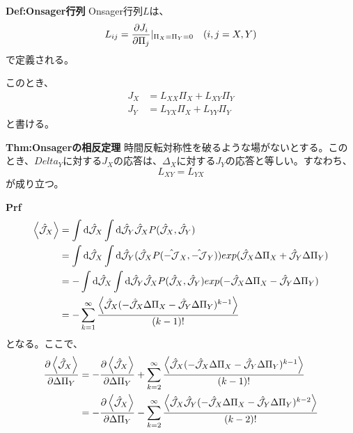 \documentclass[a4paper,11pt]{jsarticle}
\begin{document}
\begin{itembox}[l]{\textbf{Def:Onsager行列}}
    Onsager行列$L$は、
    \begin{equation}
        L_{ij} = \pdv{J_i}{\Pi_j}|_{\Pi_X=\Pi_Y=0} \quad (i,j = X,Y)
    \end{equation}
    で定義される。
\end{itembox}
このとき、
\begin{align}
    J_X &= L_{XX}\Pi_X + L_{XY}\Pi_Y\\
    J_Y &= L_{YX}\Pi_X + L_{YY}\Pi_Y
\end{align}
と書ける。\\
\begin{itembox}[l]{\textbf{Thm:Onsagerの相反定理}}
    時間反転対称性を破るような場がないとする。このとき、$Delta_Y$に対する$J_X$の応答は、$\Delta_X$に対する$J_Y$の応答と等しい。すなわち、
    \begin{equation}
        L_{XY} = L_{YX}
    \end{equation}
    が成り立つ。
\end{itembox}
\textbf{Prf}\\
\begin{align}
    \ev{\hat{\mathcal{J}}_X} &= \int \dd \hat{\mathcal{J}}_X \int \dd \hat{\mathcal{J}}_Y \hat{\mathcal{J}}_X P(\hat{\mathcal{J}}_X, \hat{\mathcal{J}}_Y)\\
    &= \int \dd \hat{\mathcal{J}}_X \int \dd \hat{\mathcal{J}}_Y (\hat{\mathcal{J}}_X P(\hat{-\mathcal{J}}_X, \hat{-\mathcal{J}}_Y))exp(\hat{\mathcal{J}}_X \Delta \Pi_X + \hat{\mathcal{J}}_Y \Delta \Pi_Y)\\
    &= -\int \dd \hat{\mathcal{J}}_X \int \dd \hat{\mathcal{J}}_Y \hat{\mathcal{J}}_X P(\hat{\mathcal{J}}_X, \hat{\mathcal{J}}_Y)exp(-\hat{\mathcal{J}}_X \Delta \Pi_X - \hat{\mathcal{J}}_Y \Delta \Pi_Y)\\
    &= -\sum_{k=1}^{\infty} \frac{\ev{\hat{\mathcal{J}}_X(-\hat{\mathcal{J}}_X\Delta \Pi_X-\hat{\mathcal{J}}_Y\Delta \Pi_Y)^{k-1}}}{(k-1)!}
\end{align}
となる。ここで、
\begin{align}
    \pdv{\ev{\hat{\mathcal{J}}_X}}{\Delta \Pi_Y} &= -\pdv{\ev{\hat{\mathcal{J}}_X}}{\Delta \Pi_Y} + \sum_{k=2}^{\infty} \frac{\ev{\hat{\mathcal{J}}_X(-\hat{\mathcal{J}}_X\Delta \Pi_X-\hat{\mathcal{J}}_Y\Delta \Pi_Y)^{k-1}}}{(k-1)!}\\
    &= -\pdv{\ev{\hat{\mathcal{J}}_X}}{\Delta \Pi_Y} - \sum_{k=2}^{\infty} \frac{\ev{\hat{\mathcal{J}}_X \hat{\mathcal{J}}_Y(-\hat{\mathcal{J}}_X\Delta \Pi_X-\hat{\mathcal{J}}_Y\Delta \Pi_Y)^{k-2}}}{(k-2)!}
\end{align}
\end{document}
